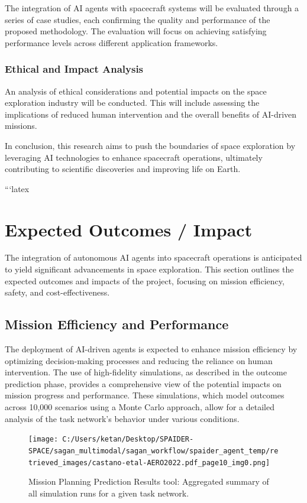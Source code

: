 \documentclass[a4paper, 11pt]{article}
\begin{document}
The integration of AI agents with spacecraft systems will be evaluated through a series of case studies, each confirming the quality and performance of the proposed methodology. The evaluation will focus on achieving satisfying performance levels across different application frameworks.

\subsubsection{Ethical and Impact Analysis}

An analysis of ethical considerations and potential impacts on the space exploration industry will be conducted. This will include assessing the implications of reduced human intervention and the overall benefits of AI-driven missions.

In conclusion, this research aims to push the boundaries of space exploration by leveraging AI technologies to enhance spacecraft operations, ultimately contributing to scientific discoveries and improving life on Earth.

```latex
\section{Expected Outcomes / Impact}

The integration of autonomous AI agents into spacecraft operations is anticipated to yield significant advancements in space exploration. This section outlines the expected outcomes and impacts of the project, focusing on mission efficiency, safety, and cost-effectiveness.

\subsection{Mission Efficiency and Performance}

The deployment of AI-driven agents is expected to enhance mission efficiency by optimizing decision-making processes and reducing the reliance on human intervention. The use of high-fidelity simulations, as described in the outcome prediction phase, provides a comprehensive view of the potential impacts on mission progress and performance. These simulations, which model outcomes across 10,000 scenarios using a Monte Carlo approach, allow for a detailed analysis of the task network's behavior under various conditions.

\begin{figure}[htbp]
    \centering
    \texttt{[image: C:/Users/ketan/Desktop/SPAIDER-SPACE/sagan\_multimodal/sagan\_workflow/spaider\_agent\_temp/retrieved\_images/castano-etal-AERO2022.pdf\_page10\_img0.png]}
    \caption{Mission Planning Prediction Results tool: Aggregated summary of all simulation runs for a given task network.}
    \label{fig:mission-planning-prediction}
\end{figure}
\end{document}
